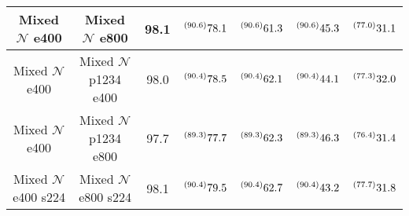 \begin{table*}[t]
\begin{tabular}{cc|c|cccc}
    Mixed $\mathcal{N}$ e400   &  Mixed $\mathcal{N}$ e800    & 98.1  &  $ \prescript{(90.6)}{}{78.1}$   &   $ \prescript{(90.6)}{}{61.3}$     &    $ \prescript{(90.6)}{}{45.3}$    &   $ \prescript{(77.0)}{}{31.1}$      \\ \hline
    Mixed $\mathcal{N}$ e400   &  Mixed $\mathcal{N}$ p1234 e400    & 98.0  &  $ \prescript{(90.4)}{}{78.5}$   &   $ \prescript{(90.4)}{}{62.1}$     &    $ \prescript{(90.4)}{}{44.1}$    &   $ \prescript{(77.3)}{}{32.0}$      \\ \hline
    Mixed $\mathcal{N}$ e400   &  Mixed $\mathcal{N}$ p1234 e800    & 97.7  &  $ \prescript{(89.3)}{}{77.7}$   &   $ \prescript{(89.3)}{}{62.3}$     &    $ \prescript{(89.3)}{}{46.3}$    &   $ \prescript{(76.4)}{}{31.4}$      \\ \hline
    Mixed $\mathcal{N}$ e400 s224   &  Mixed $\mathcal{N}$ e800 s224   & 98.1  &  $ \prescript{(90.4)}{}{79.5}$   &   $ \prescript{(90.4)}{}{62.7}$     &    $ \prescript{(90.4)}{}{43.2}$    &   $ \prescript{(77.7)}{}{31.8}$      \\ \hline
    \end{tabular}
\end{table*}




